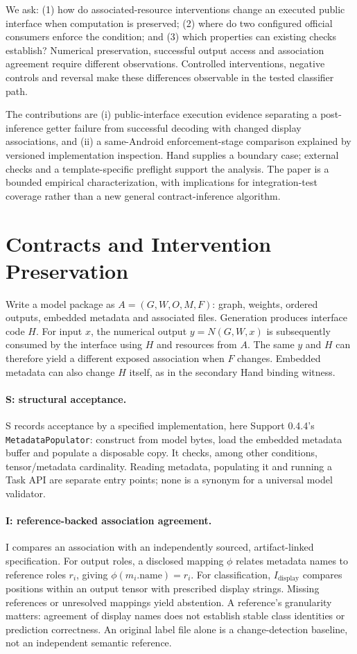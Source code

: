 \documentclass[10pt,conference]{IEEEtran}
\newcommand{\code}[1]{\texttt{#1}}
\begin{document}
We ask: (1) how do associated-resource interventions change an executed public interface when computation is preserved; (2) where do two configured official consumers enforce the condition; and (3) which properties can existing checks establish? Numerical preservation, successful output access and association agreement require different observations. Controlled interventions, negative controls and reversal make these differences observable in the tested classifier path.

The contributions are (i) public-interface execution evidence separating a post-inference getter failure from successful decoding with changed display associations, and (ii) a same-Android enforcement-stage comparison explained by versioned implementation inspection. Hand supplies a boundary case; external checks and a template-specific preflight support the analysis. The paper is a bounded empirical characterization, with implications for integration-test coverage rather than a new general contract-inference algorithm.

\section{Contracts and Intervention Preservation}
\label{sec:contracts}
Write a model package as $A=(G,W,O,M,F)$: graph, weights, ordered outputs, embedded metadata and associated files. Generation produces interface code $H$. For input $x$, the numerical output $y=N(G,W,x)$ is subsequently consumed by the interface using $H$ and resources from $A$. The same $y$ and $H$ can therefore yield a different exposed association when $F$ changes. Embedded metadata can also change $H$ itself, as in the secondary Hand binding witness.

\paragraph{S: structural acceptance.}
S records acceptance by a specified implementation, here Support 0.4.4's \code{MetadataPopulator}: construct from model bytes, load the embedded metadata buffer and populate a disposable copy. It checks, among other conditions, tensor/metadata cardinality. Reading metadata, populating it and running a Task API are separate entry points; none is a synonym for a universal model validator.

\paragraph{I: reference-backed association agreement.}
I compares an association with an independently sourced, artifact-linked specification. For output roles, a disclosed mapping $\phi$ relates metadata names to reference roles $r_i$, giving $\phi(m_i.\mathrm{name})=r_i$. For classification, $I_{\mathrm{display}}$ compares positions within an output tensor with prescribed display strings. Missing references or unresolved mappings yield abstention. A reference's granularity matters: agreement of display names does not establish stable class identities or prediction correctness. An original label file alone is a change-detection baseline, not an independent semantic reference.
\end{document}
